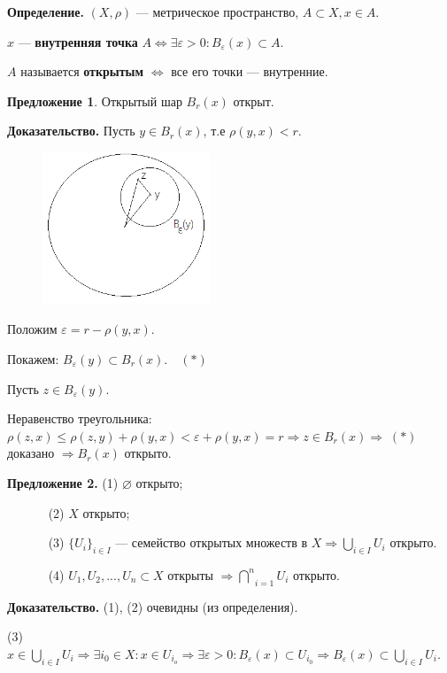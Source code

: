 \documentclass[12pt,a4paper]{article}
\begin{document}
\textbf{Определение.} $(X, \rho)$ --- метрическое пространство, $A \subset X, x \in A.$
	
$x$ --- \textbf{внутренняя точка} $A \Leftrightarrow \exists \varepsilon > 0: B_{\varepsilon}(x) \subset A.$ 
	
$A$ называется \textbf{открытым} $\Leftrightarrow$ все его точки --- внутренние.
	
\textbf{Предложение 1}. Открытый шар $B_r(x)$ открыт.
	
\textbf{Доказательство.} Пусть $y \in B_r(x)$, т.е $\rho(y,x) < r.$
	
\begin{figure}
	\includegraphics[width = 5cm]{lect2_2.png}
\end{figure}
	
Положим $\varepsilon = r - \rho(y,x).$
	
Покажем: $B_{\varepsilon}(y) \subset B_r(x). \quad (*)$
	
Пусть $z \in B_{\varepsilon}(y).$
	
Неравенство треугольника: $\rho(z, x) \leq \rho(z, y) + \rho(y, x)< \varepsilon + \rho(y, x) = r \Rightarrow z \in B_r(x) \Rightarrow \; (*)$ доказано $\Rightarrow B_r(x)$ открыто. 
	
\textbf{Предложение 2.} (1) $\varnothing$ открыто;
	
$\quad \quad \quad$ (2) $X$ открыто;
	
$\quad \quad \quad$ (3) $\{U_i\}_{i \in I}$ --- семейство открытых множеств в $X \Rightarrow \underset{i \in I}{\bigcup} U_i$ открыто.
	
$\quad \quad \quad$ (4) $U_1, U_2, ..., U_n \subset X$ открыты $\Rightarrow \underset{i = 1}{\overset{n}{\bigcap}} U_i$ открыто.
	
\textbf{Доказательство.} (1), (2) очевидны (из определения).
	
(3) $x \in \underset{i \in I}{\bigcup} U_i \Rightarrow \exists i_0 \in X\!\!: x \in U_{i_o} \Rightarrow \exists \varepsilon > 0\!\!: B_{\varepsilon}(x) \subset U_{i_0} \Rightarrow B_{\varepsilon}(x) \subset \underset{i \in I}{\bigcup} U_i.$
	
\end{document}
